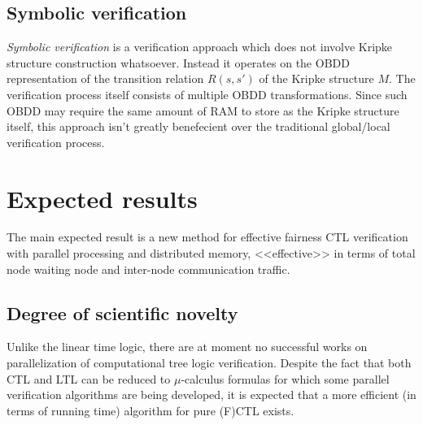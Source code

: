 \documentclass[a4paper,notitlepage,14pt]{article}
\begin{document}
\subsection{Symbolic verification}
\label{sec:symb-verif}

\emph{Symbolic verification} is a verification approach which does not involve Kripke structure
construction whatsoever. Instead it operates on the OBDD representation of the transition
relation $R(s, s')$ of the Kripke structure $M$. The verification process itself consists
of multiple OBDD transformations. Since such OBDD may require the same amount of RAM to
store as the Kripke structure itself, this approach isn't greatly benefecient over the
traditional global/local verification process.

\section{Expected results}
\label{sec:expected-results}

The main expected result is a new method for effective fairness CTL verification with
parallel processing and distributed memory, <<effective>> in terms of total node waiting
node and inter-node communication traffic.

\subsection{Degree of scientific novelty}
\label{sec:degr-scient-novelty}

Unlike the linear time logic, there are at moment no successful works on parallelization
of computational tree logic verification. Despite the fact that both CTL and LTL can be
reduced to $\mu$-calculus formulas for which some parallel verification algorithms are
being developed, it is expected that a more efficient (in terms of running time) algorithm
for pure (F)CTL exists.



\end{document}
